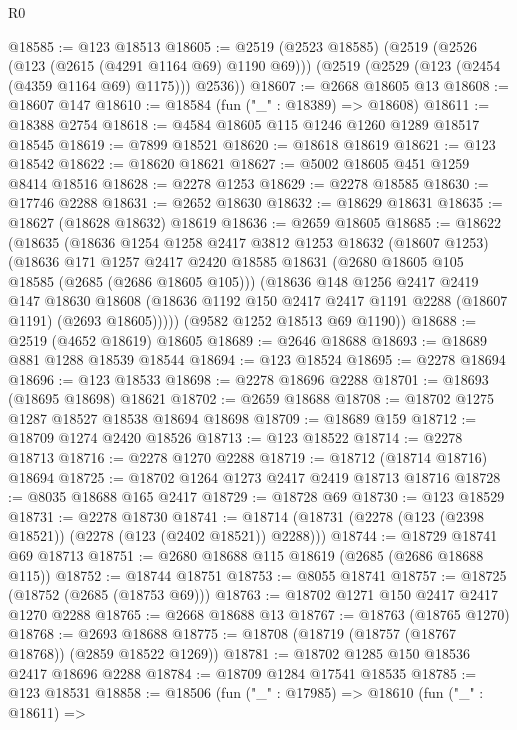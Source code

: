 \begin{lexlean}{R0}
\begin{coremodule}
@18585 := @123 @18513
@18605 := @2519
    (@2523 @18585)
    (@2519
      (@2526 (@123 (@2615 (@4291 @1164 @69) @1190 @69)))
      (@2519 (@2529 (@123 (@2454 (@4359 @1164 @69) @1175))) @2536))
@18607 := @2668 @18605 @13
@18608 := @18607 @147
@18610 := @18584 (fun ("_" : @18389) => @18608)
@18611 := @18388 @2754
@18618 := @4584 @18605 @115 @1246 @1260 @1289 @18517 @18545
@18619 := @7899 @18521
@18620 := @18618 @18619
@18621 := @123 @18542
@18622 := @18620 @18621
@18627 := @5002 @18605 @451 @1259 @8414 @18516
@18628 := @2278 @1253
@18629 := @2278 @18585
@18630 := @17746 @2288
@18631 := @2652 @18630
@18632 := @18629 @18631
@18635 := @18627 (@18628 @18632) @18619
@18636 := @2659 @18605
@18685 := @18622
    (@18635
      (@18636
        @1254
        @1258
        @2417
        @3812
        @1253
        @18632
        (@18607 @1253)
        (@18636
          @171
          @1257
          @2417
          @2420
          @18585
          @18631
          (@2680 @18605 @105 @18585 (@2685 (@2686 @18605 @105)))
          (@18636
            @148
            @1256
            @2417
            @2419
            @147
            @18630
            @18608
            (@18636 @1192 @150 @2417 @2417 @1191 @2288 (@18607 @1191) (@2693 @18605)))))
      (@9582 @1252 @18513 @69 @1190))
@18688 := @2519 (@4652 @18619) @18605
@18689 := @2646 @18688
@18693 := @18689 @881 @1288 @18539 @18544
@18694 := @123 @18524
@18695 := @2278 @18694
@18696 := @123 @18533
@18698 := @2278 @18696 @2288
@18701 := @18693 (@18695 @18698) @18621
@18702 := @2659 @18688
@18708 := @18702 @1275 @1287 @18527 @18538 @18694 @18698
@18709 := @18689 @159
@18712 := @18709 @1274 @2420 @18526
@18713 := @123 @18522
@18714 := @2278 @18713
@18716 := @2278 @1270 @2288
@18719 := @18712 (@18714 @18716) @18694
@18725 := @18702 @1264 @1273 @2417 @2419 @18713 @18716
@18728 := @8035 @18688 @165 @2417
@18729 := @18728 @69
@18730 := @123 @18529
@18731 := @2278 @18730
@18741 := @18714 (@18731 (@2278 (@123 (@2398 @18521)) (@2278 (@123 (@2402 @18521)) @2288)))
@18744 := @18729 @18741 @69 @18713
@18751 := @2680 @18688 @115 @18619 (@2685 (@2686 @18688 @115))
@18752 := @18744 @18751
@18753 := @8055 @18741
@18757 := @18725 (@18752 (@2685 (@18753 @69)))
@18763 := @18702 @1271 @150 @2417 @2417 @1270 @2288
@18765 := @2668 @18688 @13
@18767 := @18763 (@18765 @1270)
@18768 := @2693 @18688
@18775 := @18708 (@18719 (@18757 (@18767 @18768)) (@2859 @18522 @1269))
@18781 := @18702 @1285 @150 @18536 @2417 @18696 @2288
@18784 := @18709 @1284 @17541 @18535
@18785 := @123 @18531
@18858 := @18506
    (fun ("_" : @17985) =>
    @18610
      (fun ("_" : @18611) =>

\end{coremodule}
\end{lexlean}

